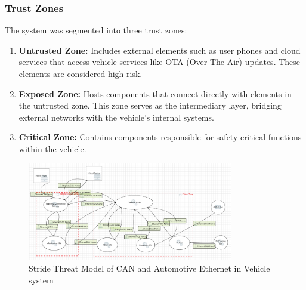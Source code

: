\documentclass{report}
\begin{document}
\subsubsection{Trust Zones}
The system was segmented into three trust zones:
\begin{enumerate}
    \item \textbf{Untrusted Zone:} Includes external elements such as user phones and cloud services that access vehicle services like OTA (Over-The-Air) updates. These elements are considered high-risk.
    \item \textbf{Exposed Zone:} Hosts components that connect directly with elements in the untrusted zone. This zone serves as the intermediary layer, bridging external networks with the vehicle's internal systems.
    \item \textbf{Critical Zone:} Contains components responsible for safety-critical functions within the vehicle.
\end{enumerate}
\begin{figure}[H]
    \centering
    \includegraphics[width=0.8\textwidth]{figures/zone.jpg}
    \caption{Stride Threat Model of CAN and Automotive Ethernet in Vehicle system}
    \label{fig:Stride}
\end{figure}
\end{document}
